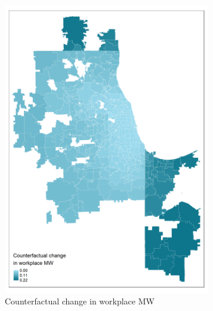 \documentclass[aspectratio=169, t]{beamer}
\begin{document}
\begin{frame}
\begin{figure}
\begin{subfigure}{0.33\textwidth}
                         \includegraphics[width = 0.99\textwidth]{counterfactuals/output/chicago_d_exp_ln_mw.png}
			\caption*{Counterfactual change in workplace MW}
		\end{subfigure}
		\begin{subfigure}{0.33\textwidth}

\end{subfigure}
\end{figure}
\end{frame}
\end{document}
